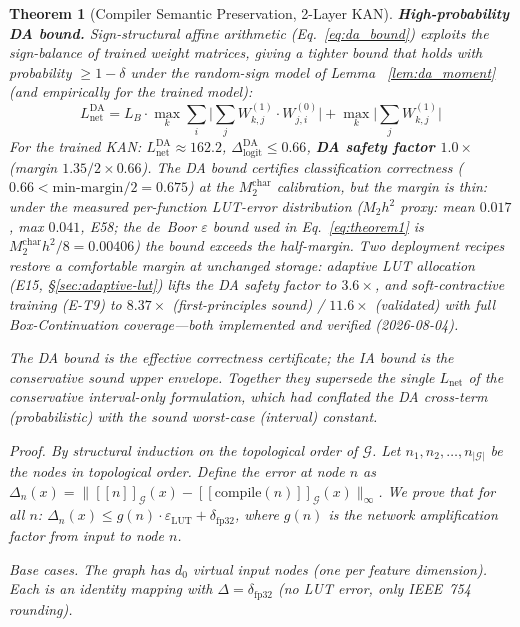 \documentclass[journal,onecolumn]{IEEEtran}
\newcommand{\llbracket}{[\![}
\newcommand{\rrbracket}{]\!]}
\newtheorem{theorem}{Theorem}
\begin{document}
\begin{theorem}[Compiler Semantic Preservation, 2-Layer KAN]
\textbf{High-probability DA bound.} Sign-structural affine arithmetic (Eq.~\ref{eq:da_bound})
exploits the sign-balance of trained weight matrices, giving a tighter
bound that holds with probability $\geq 1-\delta$ under the random-sign model
of Lemma~
\ref{lem:da_moment} (and empirically for the trained model):
\begin{equation}
L_{\text{net}}^{\text{DA}} = L_B \cdot \max_{k} \sum_{i}
\bigl|\sum_{j} W^{(1)}_{k,j} \cdot W^{(0)}_{j,i}\bigr|
+ \max_{k} \bigl|\sum_{j} W^{(1)}_{k,j}\bigr|
\label{eq:l_net}
\end{equation}
For the trained KAN: $L_{\text{net}}^{\text{DA}} \approx 162.2$,
$\Delta_{\text{logit}}^{\text{DA}} \leq \mathbf{0.66}$,
\textbf{DA safety factor $1.0\times$} (margin $1.35 / 2{\times}0.66$). The DA
bound certifies classification correctness ($0.66 <
\text{min-margin}/2 = 0.675$) at the $M_2^{\text{char}}$ calibration,
but the margin is thin: under the measured per-function LUT-error
distribution ($M_2 h^2$ proxy: mean $0.017$, max $0.041$, E58; the
de~Boor $\varepsilon$ bound used in Eq.~\ref{eq:theorem1} is
$M_2^{\text{char}} h^2/8 = 0.00406$) the bound
exceeds the half-margin. Two deployment recipes restore a comfortable
margin at unchanged storage: adaptive LUT allocation (E15,
{\S}\ref{sec:adaptive-lut}) lifts the DA safety factor to $3.6\times$,
and soft-contractive training (E-T9) to $8.37\times$ (first-principles
sound) / $11.6\times$ (validated) with full
Box-Continuation coverage---both implemented and verified
(2026-08-04).

The DA bound is the effective correctness certificate;
the IA bound is the conservative sound upper envelope.
Together they supersede the single $L_{\text{net}}$ of the conservative interval-only formulation, which
had conflated the DA cross-term (probabilistic) with the sound worst-case
(interval) constant.

\vspace{4pt}
\noindent\textit{Proof.} By structural induction on the topological
order of $\mathcal{G}$. Let $n_1, n_2, \dots, n_{|\mathcal{G}|}$ be
the nodes in topological order. Define the error at node $n$ as
$\Delta_n(x) = \|\llbracket n \rrbracket_{\mathcal{G}}(x) -
\llbracket\text{compile}(n) \rrbracket_{\mathcal{G}}(x)\|_\infty$.
We prove that for all $n$: $\Delta_n(x) \leq g(n) \cdot
\varepsilon_{\text{LUT}} + \delta_{\text{fp32}}$, where $g(n)$ is the
network amplification factor from input to node $n$.

\textit{Base cases.} The graph has $d_0$ virtual input
nodes (one per feature dimension). Each is an identity mapping with
$\Delta = \delta_{\text{fp32}}$ (no LUT error, only IEEE~754 rounding).


\end{theorem}
\end{document}
